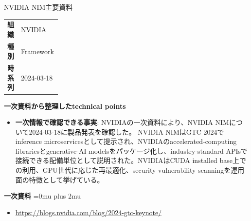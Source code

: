 \Needspace{0.38\textheight}
\begin{technicalnote}{NVIDIA NIM}{主要資料}
\begingroup
\begin{tabularx}{\linewidth}{@{}>{\bfseries}p{0.22\linewidth}X@{}}
組織 & NVIDIA \\
種別 & Framework \\
時系列 & 2024-03-18 \\
\end{tabularx}
\smallskip
\begin{minipage}{\linewidth}
{\bfseries 一次資料から整理したtechnical points}
\begin{itemize}[leftmargin=1.5em,itemsep=0.35em]
\item \textbf{一次情報で確認できる事実}: NVIDIAの一次資料により、NVIDIA NIMについて2024-03-18に製品発表を確認した。 NVIDIA NIMはGTC 2024でinference microservicesとして提示され、NVIDIAのaccelerated-computing librariesとgenerative-AI modelsをパッケージ化し、industry-standard APIsで接続できる配備単位として説明された。NVIDIAはCUDA installed base上での利用、GPU世代に応じた再最適化、security vulnerability scanningを運用面の特徴として挙げている。
\end{itemize}
\begin{minipage}{\linewidth}
\begin{samepage}
{\bfseries 一次資料}
\begingroup\sloppy
\Urlmuskip=0mu plus 2mu\relax
\begin{itemize}[leftmargin=1.5em,itemsep=0.25em]
\item {\scriptsize\url{https://blogs.nvidia.com/blog/2024-gtc-keynote/}}
\end{itemize}
\endgroup
\end{samepage}
\end{minipage}
\end{minipage}
\endgroup
\end{technicalnote}
\medskip

